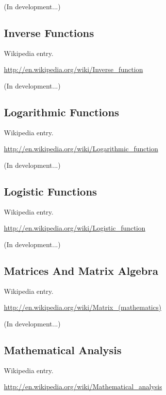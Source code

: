 \documentclass[12pt,oneside]{book}
\begin{document}
(In development...)

\subsection[Inverse Functions]{Inverse Functions}

Wikipedia entry.

\href{http://en.wikipedia.org/wiki/Inverse_function}{http://en.wikipedia.org/wiki/Inverse\_function}

(In development...)

\subsection[Logarithmic Functions]{Logarithmic Functions}

Wikipedia entry.

\href{http://en.wikipedia.org/wiki/Logarithmic_function}{http://en.wikipedia.org/wiki/Logarithmic\_function}

(In development...)

\subsection[Logistic Functions]{Logistic Functions}

Wikipedia entry.

\href{http://en.wikipedia.org/wiki/Logistic_function}{http://en.wikipedia.org/wiki/Logistic\_function}

(In development...)

\subsection[Matrices And Matrix Algebra]{Matrices And Matrix Algebra}

Wikipedia entry.

\href{http://en.wikipedia.org/wiki/Matrix_(mathematics)}{http://en.wikipedia.org/wiki/Matrix\_(mathematics)}

(In development...)

\subsection[Mathematical Analysis]{Mathematical Analysis}

Wikipedia entry.

\href{http://en.wikipedia.org/wiki/Mathematical_analysis}{http://en.wikipedia.org/wiki/Mathematical\_analysis}
\end{document}
